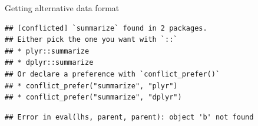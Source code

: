 \documentclass[ignorenonframetext,]{beamer}
\newenvironment{Shaded}{\begin{snugshade}}{\end{snugshade}}
\newcommand{\DataTypeTok}[1]{\textcolor[rgb]{0.13,0.29,0.53}{#1}}
\newcommand{\DecValTok}[1]{\textcolor[rgb]{0.00,0.00,0.81}{#1}}
\newcommand{\KeywordTok}[1]{\textcolor[rgb]{0.13,0.29,0.53}{\textbf{#1}}}
\newcommand{\NormalTok}[1]{#1}
\newcommand{\OperatorTok}[1]{\textcolor[rgb]{0.81,0.36,0.00}{\textbf{#1}}}
\newcommand{\StringTok}[1]{\textcolor[rgb]{0.31,0.60,0.02}{#1}}
\begin{document}
\begin{frame}[fragile]{Getting alternative data format}
\protect\hypertarget{getting-alternative-data-format}{}

\begin{Shaded}
\end{Shaded}

\begin{verbatim}
## [conflicted] `summarize` found in 2 packages.
## Either pick the one you want with `::` 
## * plyr::summarize
## * dplyr::summarize
## Or declare a preference with `conflict_prefer()`
## * conflict_prefer("summarize", "plyr")
## * conflict_prefer("summarize", "dplyr")
\end{verbatim}

\begin{Shaded}
\end{Shaded}

\begin{verbatim}
## Error in eval(lhs, parent, parent): object 'b' not found
\end{verbatim}

\end{frame}
\end{document}
